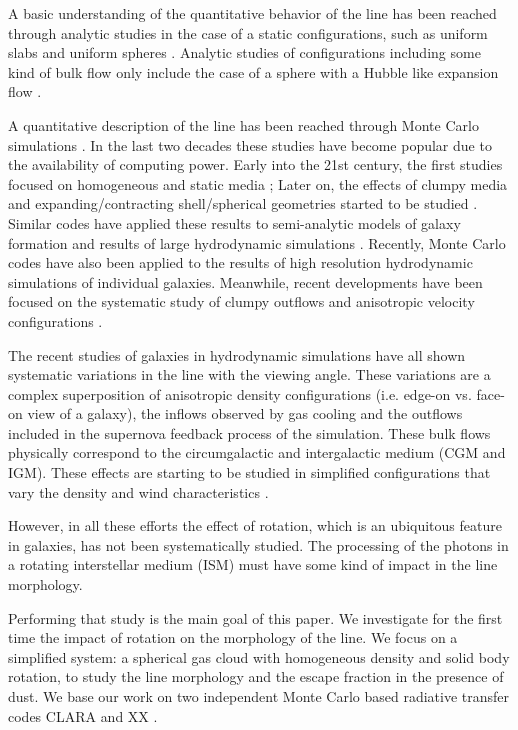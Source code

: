 \documentclass{emulateapj}
\newcommand{\ly}{{\ifmmode{{\rm Ly}\alpha~}\else{Ly$\alpha$~}\fi}}
\begin{document}
A basic understanding of the quantitative behavior of the \ly line
has been reached through analytic studies in the case of a static
configurations, such as uniform slabs
\citep{Harrington73,Neufeld90} and uniform spheres
\citep{Dijkstra06}. Analytic studies of configurations including
some kind of bulk flow only include the case of a sphere with a Hubble
like expansion flow \citep{LoebRybicki}. 

A quantitative description of the \ly line has been reached through
Monte Carlo simulations \citep{Auer68,Avery68,Adams72}. In the last
two decades these studies have become popular due to the
availability of computing power. Early into the 21st century, the first
studies focused on homogeneous and static media
\citep{Ahn00,Ahn01,Zheng02}; Later on, the effects of clumpy media
\citep{Hansen06} and expanding/contracting shell/spherical geometries started to
be studied \citep{Verhamme06,Dijkstra06}. Similar codes have applied
these results to semi-analytic models of galaxy formation \citep{Orsi12} and
results of large hydrodynamic simulations
\citep{CLARA,Forero12,Behrens13}. Recently, Monte Carlo codes have also
been applied to the results of high resolution hydrodynamic
simulations of individual
galaxies\citep{Laursen09,Barnes11,Verhamme12,Yajima12}. Meanwhile, recent
developments have been focused on the systematic study of clumpy
outflows \citep{DijkstraKramer}and anisotropic velocity configurations
\citep{Zheng2013}. 

The recent studies of galaxies in hydrodynamic simulations
\citep{Laursen09,Barnes11,Verhamme12,Yajima12} have all shown
systematic variations in the \ly line with the viewing angle. These
variations are a complex superposition of anisotropic density
configurations (i.e. edge-on vs. face-on view of a galaxy), the
inflows observed by gas cooling and the outflows included in the
supernova feedback process of the simulation. These bulk flows
physically correspond to the circumgalactic and intergalactic medium
(CGM and IGM). These effects are starting to be studied
 in simplified configurations that vary the density and wind
 characteristics \citep{Zheng2013}. 

However, in all these efforts the effect of rotation,
which is an ubiquitous feature in galaxies, has not been
systematically studied. The processing of the \ly photons in a
rotating interstellar medium (ISM) must have some kind of impact in
the \ly line morphology. 

Performing that study is the main goal of this paper. We investigate for the
first time the impact of rotation on the morphology of the \ly line. We focus on a simplified system: a spherical gas cloud
with homogeneous density and solid body rotation, to study the line
morphology and the escape fraction in the presence of dust. We base
our work on two independent Monte Carlo based radiative transfer codes
CLARA \citep{CLARA} and XX \citep{DijkstraKramer} .   
  
\end{document}
